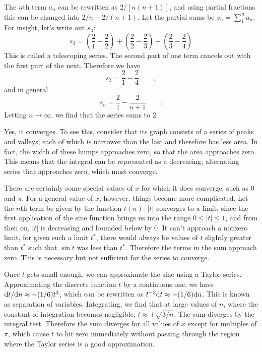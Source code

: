 The $n$th term $a_n$ can be rewritten as $2/[n(n+1)]$, and using partial fractions this can be changed into
$2/n-2/(n+1)$. Let the partial sums be $s_n=\sum_1^n a_n$. For insight, let's write out $s_3$:
\begin{equation*}
  s_3 = \left(\frac{2}{1}-\frac{2}{2}\right)+\left(\frac{2}{2}-\frac{2}{3}\right)+\left(\frac{2}{3}-\frac{2}{4}\right)
\end{equation*}
This is called a telescoping series.
The second part of one term cancels out with the first part of the next. Therefore we have 
\begin{equation*}
  s_3 = \frac{2}{1}-\frac{2}{4} \qquad ,
\end{equation*}
and in general
\begin{equation*}
  s_n = \frac{2}{1}-\frac{2}{n+1} \qquad .
\end{equation*}
Letting $n\rightarrow\infty$, we find that the series sums to 2.

Yes, it converges. To see this, consider that its graph consists of a series of peaks and valleys, each of
which is narrower than the last and therefore has less area. In fact, the width of these humps approaches
zero, so that the area approaches zero. This means that the integral can be represented
as a decreasing, alternating series that approaches zero, which must converge.

There are certainly some special values of $x$ for which it does converge, such as 0 and $\pi$.
For a general value of $x$, however, things become more complicated. Let the $n$th term be given by the function $t(n)$.
$|t|$ converges to a limit, since the first application of the sine function brings us into the range $0\le |t|\le 1$,
and from then on, $|t|$ is decreasing and bounded below by 0. It can't approach a nonzero limit, for given such a limit $t^*$,
there would always be values of $t$ slightly greater than $t^*$ such that $\sin t$ was less than $t^*$. Therefore the terms
in the sum approach zero. This is necessary but not sufficient for the series to converge.

Once $t$ gets small enough, we can approximate the sine
using a Taylor series. Approximating the discrete function $t$ by a continuous one,
we have $\textup{d} t/\textup{d} n\approx -(1/6)t^3$, which can be rewritten as $t^{-3}\textup{d} t\approx -(1/6)\textup{d} n$. This is known as
separation of variables. Integrating, we find that at large values of $n$, where the constant of integration becomes negligible,
$t\approx \pm\sqrt{3/n}$. The sum diverges by the integral test. Therefore the sum diverges for all values of $x$ except for
multiples of $\pi$, which cause $t$ to hit zero immediately without passing through the region where the Taylor series
is a good approximation.

